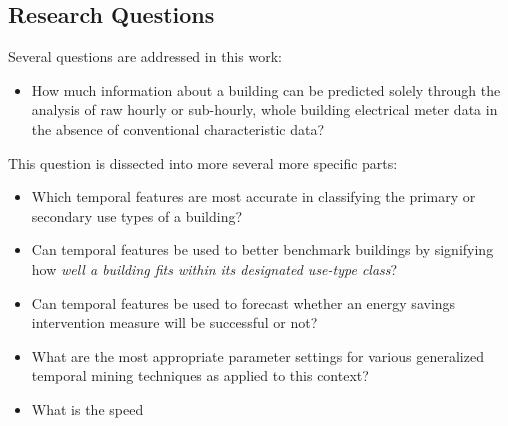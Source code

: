 \subsection{Research Questions}
Several questions are addressed in this work:
\begin{itemize}
\item How much information about a building can be predicted solely through the analysis of raw hourly or sub-hourly, whole building electrical meter data in the absence of conventional characteristic data? 
\end{itemize}
This question is dissected into more several more specific parts:
\begin{itemize}
\item Which temporal features are most accurate in classifying the primary or secondary use types of a building?
\item Can temporal features be used to better benchmark buildings by signifying how \emph{well a building fits within its designated use-type class}?
\item Can temporal features be used to forecast whether an energy savings intervention measure will be successful or not?
\item What are the most appropriate parameter settings for various generalized temporal mining techniques as applied to this context?
\item What is the speed
\end{itemize}






